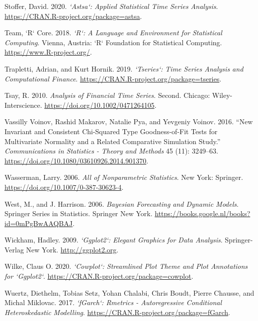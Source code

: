 \begin{CSLReferences}{1}{0}
\leavevmode{}%
Stoffer, David. 2020. \emph{`Astsa`: Applied Statistical Time Series Analysis}. \url{https://CRAN.R-project.org/package=astsa}.

\leavevmode{}%
Team, `R` Core. 2018. \emph{{`R`}: A Language and Environment for Statistical Computing}. Vienna, Austria: {`R`} Foundation for Statistical Computing. \url{https://www.R-project.org/}.

\leavevmode{}%
Trapletti, Adrian, and Kurt Hornik. 2019. \emph{`Tseries`: Time Series Analysis and Computational Finance}. \url{https://CRAN.R-project.org/package=tseries}.

\leavevmode{}%
Tsay, R. 2010. \emph{Analysis of Financial Time Series}. Second. Chicago: Wiley-Interscience. \url{https://doi.org/10.1002/0471264105}.

\leavevmode{}%
Vassilly Voinov, Rashid Makarov, Natalie Pya, and Yevgeniy Voinov. 2016. {``New Invariant and Consistent Chi-Squared Type Goodness-of-Fit Tests for Multivariate Normality and a Related Comparative Simulation Study.''} \emph{Communications in Statistics - Theory and Methods} 45 (11): 3249--63. \url{https://doi.org/10.1080/03610926.2014.901370}.

\leavevmode{}%
Wasserman, Larry. 2006. \emph{All of Nonparametric Statistics}. New York: Springer. \url{https://doi.org/10.1007/0-387-30623-4}.

\leavevmode{}%
West, M., and J. Harrison. 2006. \emph{Bayesian Forecasting and Dynamic Models}. Springer Series in Statistics. Springer New York. \url{https://books.google.nl/books?id=0mPgBwAAQBAJ}.

\leavevmode{}%
Wickham, Hadley. 2009. \emph{`Ggplot2`: Elegant Graphics for Data Analysis}. Springer-Verlag New York. \url{http://ggplot2.org}.

\leavevmode{}%
Wilke, Claus O. 2020. \emph{`Cowplot`: Streamlined Plot Theme and Plot Annotations for `Ggplot2`}. \url{https://CRAN.R-project.org/package=cowplot}.

\leavevmode{}%
Wuertz, Diethelm, Tobias Setz, Yohan Chalabi, Chris Boudt, Pierre Chausse, and Michal Miklovac. 2017. \emph{`fGarch`: Rmetrics - Autoregressive Conditional Heteroskedastic Modelling}. \url{https://CRAN.R-project.org/package=fGarch}.

\end{CSLReferences}

